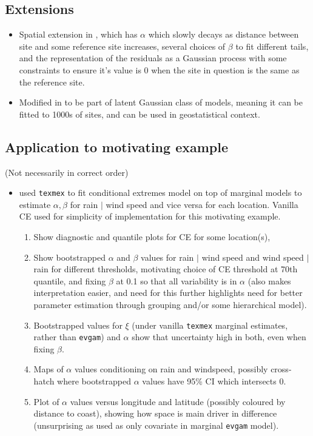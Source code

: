 \documentclass{article}
\numberwithin{equation}{section}
\begin{document}
\subsection{Extensions}
\begin{itemize}
  \item Spatial extension in \cite{Wadsworth2018}, which has $\alpha$ which slowly decays as distance between site and some reference site increases, several choices of $\beta$ to fit different tails, and the representation of the residuals as a Gaussian process with some constraints to ensure it's value is 0 when the site in question is the same as the reference site. 
  \item Modified in \cite{Simpson2023} to be part of latent Gaussian class of models, meaning it can be fitted to 1000s of sites, and can be used in geostatistical context.
\end{itemize}

\subsection{Application to motivating example}

(Not necessarily in correct order)
\begin{itemize}
  \item used \texttt{texmex} to fit conditional extremes model on top of marginal models to estimate $\alpha, \beta$ for rain $\mid$ wind speed and vice versa for each location. 
        Vanilla CE used for simplicity of implementation for this motivating example. 
   \begin{enumerate}
     \item Show diagnostic and quantile plots for CE for some location(s),
     \item Show bootstrapped $\alpha$ and $\beta$ values for rain $\mid$ wind speed and wind speed $\mid$ rain for different thresholds, motivating choice of CE threshold at 70th quantile, and fixing $\beta$ at 0.1 so that all variability is in $\alpha$ (also makes interpretation easier, and need for this further highlights need for better parameter estimation through grouping and/or some hierarchical model). 
     \item Bootstrapped values for $\xi$ (under vanilla \texttt{texmex} marginal estimates, rather than \texttt{evgam}) and $\alpha$ show that uncertainty high in both, even when fixing $\beta$. 
     \item Maps of $\alpha$ values conditioning on rain and windspeed, possibly cross-hatch where bootstrapped $\alpha$ values have 95\% CI which intersects 0. 
     \item Plot of $\alpha$ values versus longitude and latitude (possibly coloured by distance to coast), showing how space is main driver in difference (unsurprising as used as only covariate in marginal \texttt{evgam} model). 
   \end{enumerate}
\end{itemize}
\end{document}
